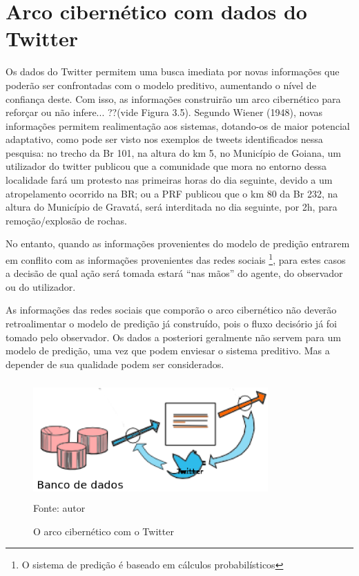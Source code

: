 \section{Arco cibernético com dados do Twitter}

Os dados do Twitter permitem uma busca imediata por novas informações que poderão ser confrontadas com o 
modelo preditivo, aumentando o nível de confiança deste. Com isso, as informações construirão um arco cibernético para reforçar ou não infere... ??(vide Figura 3.5). Segundo Wiener (1948), novas informações permitem realimentação aos sistemas, dotando-os de maior potencial adaptativo, como pode ser visto nos exemplos de tweets identificados nessa pesquisa: no trecho da Br 101, na altura do km 5, no 
Município de Goiana, um utilizador do twitter publicou que a comunidade que mora no entorno dessa localidade fará um protesto nas primeiras horas do dia seguinte, devido a um  
atropelamento ocorrido na BR; ou a PRF publicou que o km 80 da Br 232, na altura do Município de Gravatá, será interditada no dia seguinte, por 2h, para 
remoção/explosão de rochas.

No entanto, quando as informações provenientes do modelo de predição entrarem em conflito com as informações 
provenientes das redes sociais \footnote{O sistema de predição é baseado em cálculos probabilísticos}, para estes casos a decisão de qual ação será tomada estará ``nas mãos'' do agente, do observador ou do utilizador.

As informações das redes sociais que comporão o arco cibernético não deverão retroalimentar o modelo de predição já construído, pois o fluxo decisório já foi tomado pelo observador. Os dados a posteriori geralmente não servem para um modelo de predição, uma vez que podem enviesar o sistema preditivo. Mas a depender de sua qualidade podem ser considerados.

\begin{figure}[ht]
	\centering
	\caption{O arco cibernético com o Twitter}
	\includegraphics[width=90mm, height=45mm]{Figuras/Metodologia/ArcoCibernetico.png}\\
	\tiny Fonte: autor
\end{figure}

